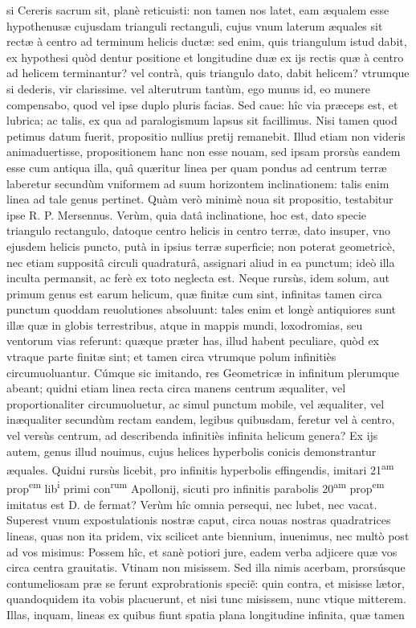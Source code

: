 \documentclass[11pt,a4paper]{article}
\begin{document}

si Cereris sacrum sit, planè reticuisti: non tamen nos latet, eam æqualem esse hypothenusæ cujusdam trianguli rectanguli, cujus vnum laterum æquales sit rectæ à centro ad terminum helicis ductæ: sed enim, quis triangulum istud dabit, ex hypothesi quòd dentur positione et longitudine duæ ex ijs rectis quæ à centro ad helicem terminantur? vel contrà, quis triangulo dato, dabit helicem? vtrumque si dederis, vir clarissime. vel alterutrum tantùm, ego munus id, eo munere compensabo, quod vel ipse duplo pluris facias. Sed caue: hîc via præceps est, et lubrica; ac talis, ex qua ad paralogismum lapsus sit facillimus. Nisi tamen quod petimus datum fuerit, propositio nullius pretij remanebit. Illud etiam non videris animaduertisse, propositionem hanc non esse nouam, sed ipsam prorsùs eandem esse cum antiqua illa, quâ quæritur linea per quam pondus ad centrum terræ laberetur secundùm vniformem ad suum horizontem inclinationem: talis enim linea ad tale genus pertinet. Quàm verò minimè noua sit propositio, testabitur ipse R. P. Mersennus. Verùm, quia datâ inclinatione, hoc est, dato specie triangulo rectangulo, datoque centro helicis in centro terræ, dato insuper, vno ejusdem helicis puncto, putà in ipsius terræ superficie; non poterat geometricè, nec etiam suppositâ circuli quadraturâ, assignari aliud in ea punctum; ideò illa inculta permansit, ac ferè ex toto neglecta est. Neque rursùs, idem solum, aut primum genus est earum helicum, quæ finitæ cum sint, infinitas tamen circa punctum quoddam reuolutiones absoluunt: tales enim et longè antiquiores sunt illæ quæ in globis terrestribus, atque in mappis mundi, loxodromias, seu ventorum vias referunt: quæque præter has, illud habent peculiare, quòd ex vtraque parte finitæ sint; et tamen circa vtrumque polum infinitiès circumuoluantur. Cúmque sic imitando, res Geometricæ in infinitum plerumque abeant; quidni etiam linea recta circa manens centrum æqualiter, vel proportionaliter circumuoluetur, ac simul punctum mobile, vel æqualiter, vel inæqualiter secundùm rectam eandem, legibus quibusdam, feretur vel à centro, vel versùs centrum, ad describenda infinitiès infinita helicum genera? Ex ijs autem, genus illud nouimus, cujus helices hyperbolis conicis demonstrantur æquales. Quidni rursùs licebit, pro infinitis hyperbolis effingendis, imitari 21\textsuperscript{am} prop\textsuperscript{em} lib\textsuperscript{i} primi con\textsuperscript{rum} Apollonij, sicuti pro infinitis parabolis 20\textsuperscript{am} prop\textsuperscript{em} imitatus est D. de fermat? Verùm hîc omnia persequi, nec lubet, nec vacat. Superest vnum expostulationis nostræ caput, circa nouas nostras quadratrices lineas, quas non ita pridem, vix scilicet ante biennium, inuenimus, nec multò post ad vos misimus: Possem hîc, et sanè potiori jure, eadem verba adjicere quæ vos circa centra grauitatis. Vtinam non misissem. Sed illa nimis acerbam, prorsúsque contumeliosam præ se ferunt exprobrationis speciẽ: quin contra, et misisse lætor, quandoquidem ita vobis placuerunt, et nisi tunc misissem, nunc vtique mitterem. Illas, inquam, lineas ex quibus fiunt spatia plana longitudine infinita, quæ tamen
\end{document}
